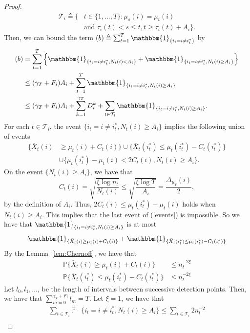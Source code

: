 \documentclass[letterpaper]{article} %
\begin{document}
\begin{proof}
\begin{align}
\mathcal{T}_i\triangleq\{&t\in\{1,\ldots,T\}:\mu_s(i)=\mu_t(i)\\
&\text{and } \tau_i(t)<s\leq t, t\geq \tau_i(t)+A_i\}.
\end{align}
Then, we can bound the term $(b)\triangleq\sum_{t=1}^T\mathbbm{1}_{\{i_t=i\neq i^*_t\}}$ by
\begin{align}\nonumber
(b)&=\sum_{t=1}^T\left\{\mathbbm{1}_{\{i_t=i\neq i^*_t,N_t(i)<A_i\}}+\mathbbm{1}_{\{i_t=i\neq i^*_t,N_t(i)\geq A_i\}}\right\}\\
&\leq (\gamma_T+F_i)A_i+\sum_{t=1}^T\mathbbm{1}_{\{i_t=i\neq i^*_t,N_t(i)\geq A_i\}}\\\nonumber
&\leq (\gamma_T+F_i)A_i+\sum_{k=1}^{\gamma_T}D_i^k+\sum_{t\in\mathcal{T}_i}\mathbbm{1}_{\{i_t=i\neq i^*_t,N_t(i)\geq A_i\}}.
\end{align}
For each $t\in\mathcal{T}_i$, the event $\{i_t=i\neq i^*_t,N_t(i)\geq A_i\}$ implies the following union of events
\begin{align}\nonumber
\{\bar{X}_t(i)&\geq \mu_t(i)+C_t(i)\}\cup\{\bar{X}_t(i^*_t)\leq\mu_t(i^*_t)-C_t(i^*_t)\}\\
&\cup\{\mu_t(i^*_t)-\mu_t(i)<2C_t(i), N_t(i)\geq A_i\}.
\label{events}
\end{align}
On the event $\{N_t(i)\geq A_i\}$, we have that
\begin{equation}
C_t(i)=\sqrt{\frac{\xi\log n_t}{N_t(i)}}\leq \sqrt{\frac{\xi\log T}{A_i}}=\frac{\Delta_{\mu_T}(i)}{2},
\end{equation}
by the definition of $A_i$. Thus, $2C_t(i)\leq \mu_t(i^*_t)-\mu_t(i)$ holds when $N_t(i)\geq A_i$. This implies that the last event of (\ref{events}) is impossible. So we have that $ \mathbbm{1}_{\{i_t=i\neq i^*_t,N_t(i)\geq A_i\}}$ is at most
\begin{equation}
\mathbbm{1}_{\{\bar{X}_t(i)\geq \mu_t(i)+C_t(i)\}}+\mathbbm{1}_{\{\bar{X}_t(i^*_t)\leq\mu_t(i^*_t)-C_t(i^*_t)\}}
\end{equation}
By the Lemma~\ref{lem:Chernoff}, we have that
\begin{align}
\mathbb{P}{\{\bar{X}_t(i)\geq \mu_t(i)+C_t(i)\}}&\leq n_t^{-2\xi}\\
\mathbb{P}{\{\bar{X}_t(i^*_t)\leq\mu_t(i^*_t)-C_t(i^*_t)\}}&\leq n_t^{-2\xi}
\end{align}
Let $l_0,l_1,\ldots$, be the length of intervals between successive detection points. Then, we have that $\sum_{m=0}^{\gamma_T+F_i}l_m=T$.
Let $\xi=1$, we have that
\begin{align}
\sum_{t\in\mathcal{T}_i}\mathbb{P}&\{i_t=i\neq i^*_t,N_t(i)\geq A_i\}\leq\sum_{t\in\mathcal{T}_i}2n_t^{-2}\\

\end{align}
\end{proof}
\end{document}
